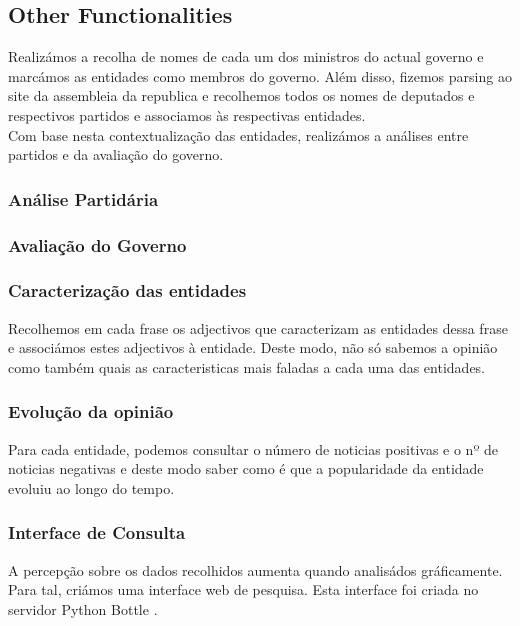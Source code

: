 \subsection{Other Functionalities}
Realizámos a recolha de nomes de cada um dos ministros do actual governo e marcámos as entidades como membros do governo. Além disso, fizemos parsing ao site da assembleia da republica e recolhemos todos os nomes de deputados e respectivos partidos e associamos às respectivas entidades.\\
Com base nesta contextualização das entidades, realizámos a análises entre partidos e da avaliação do governo.
\subsubsection{Análise Partidária}


\subsubsection{Avaliação do Governo}


\subsubsection{Caracterização das entidades}
Recolhemos em cada frase os adjectivos que caracterizam as entidades dessa frase e associámos estes adjectivos à entidade. Deste modo, não só sabemos a opinião como também quais as caracteristicas mais faladas a cada uma das entidades.

\subsubsection{Evolução da opinião}
Para cada entidade, podemos consultar o número de noticias positivas e o nº de noticias negativas e deste modo saber como é que a popularidade da entidade evoluiu ao longo do tempo.

\subsubsection{Interface de Consulta}
A percepção sobre os dados recolhidos aumenta quando analisádos gráficamente. Para tal, criámos uma interface web de pesquisa. Esta interface foi criada no servidor Python Bottle \cite{bottle}. 